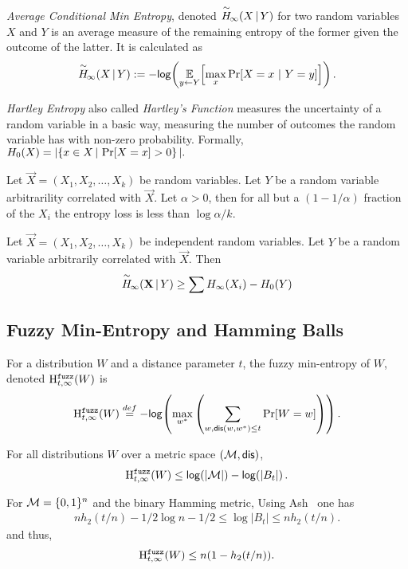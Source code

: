 \begin{definition}
    \emph{Average Conditional Min Entropy}, denoted $\overset{\sim}{H}\!_{\infty}\!\left(X\,|\,Y\right)$ for two random variables $X$ and $Y$ is an average measure of the remaining entropy of the former given the outcome of the latter. It is calculated as \[ \overset{\sim}{H}\!_{\infty}\!\left(X\,|\,Y\right) := -\mathsf{log}\!\left(\operatorname*{\mathbb{E}}\limits_{y \leftarrow Y}\!\left[\max\limits_{x} \Pr\!\left[X = x\ |\ Y = y\right]\right]\right).\] 
\end{definition}


\begin{definition}
    \emph{Hartley Entropy} also called \emph{Hartley's Function} measures the uncertainty of a random variable in a basic way, measuring the number of outcomes the random variable has with non-zero probability. Formally, $
    H_0\!\left(X\right) = | \!\left\{ x \in X\,|\, \Pr\!\left[X = x\right] > 0 \right\}|.
    $
\end{definition}

\begin{lemma}{\cite[Lemma 2.2a]{dodis2008fuzzy}}
    \label{lem:markovpred}
    Let $\vec{X} = (X_1, X_2, \ldots, X_k)$ be random variables. Let $Y$ be a random variable arbitrarility correlated with $\vec{X}$. 
    Let $\alpha > 0$, then for all but a $(1-1/\alpha)$ fraction of the $X_i$ the entropy loss is less than $\log{\alpha}/k$. 
\end{lemma}

\begin{lemma}
    \label{lem:conditionalminentloss}
    Let $\vec{X} = (X_1, X_2, \ldots, X_k)$ be independent random variables. 
    Let $Y$ be a random variable arbitrarily correlated with $\vec{X}$. 
    Then 
    \[
        \overset{\sim}{H}\!_{\infty}\!\left(\mathbf{X}\,|\,Y\right) \geq \sum H_{\infty}\!\left(X_i\right) - H_0\!\left(Y\right)
    \]
\end{lemma} 



\subsection{Fuzzy Min-Entropy and Hamming Balls}
\begin{definition}

For a distribution $W$ and a distance parameter $t$, the fuzzy min-entropy of $W$, denoted $\mathrm{H}^{\mathtt{fuzz}}_{t,\infty}(W)$ is 
\[
\mathrm{H}^{\mathtt{fuzz}}_{t,\infty}(W) \overset{def}= -\mathsf{log}\!\left( \max_{w^*} \left(\sum_{w, \mathsf{dis}(w, w^*)\le t} \Pr[W=w] \right)\right).
\]
\end{definition}

\begin{lemma} \label{lem:max fuzz ent}
For all distributions $W$ over a metric space $(\mathcal{M}, \mathsf{dis})$, 
\[\mathrm{H}^{\mathtt{fuzz}}_{t,\infty}(W) \le \mathsf{log}\!\left(|\mathcal{M}|\right) - \mathsf{log}\!\left(|B_t|\right).
\]
\end{lemma}
\noindent
For $\mathcal{M} = \{0, 1\}^n$ and the binary Hamming metric,
Using Ash~\cite[Lemma 4.7.2, Equation 4.7.5, p. 115]{ash2012information} one has
\begin{align} nh_2(t/n)  -1/2\log{n} - 1/2 \le \log{|B_t|} \le  nh_2(t/n)\label{eq:size of balls}.\end{align}
and thus, 
\[
\mathrm{H}^{\mathtt{fuzz}}_{t,\infty}(W) \le n(1-h_2(t/n)).
\]

